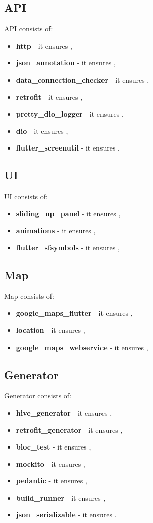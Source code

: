 \subsection{API}\label{subsec:api}
API consists of:
\begin{itemize}
    \item \textbf{http} - it ensures ,
    \item \textbf{json\_annotation} - it ensures ,
    \item \textbf{data\_connection\_checker} - it ensures ,
    \item \textbf{retrofit} - it ensures ,
    \item \textbf{pretty\_dio\_logger} - it ensures ,
    \item \textbf{dio} - it ensures ,
    \item \textbf{flutter\_screenutil} - it ensures ,
\end{itemize}

\subsection{UI}\label{subsec:ui}
UI consists of:
\begin{itemize}
    \item \textbf{sliding\_up\_panel} - it ensures ,
    \item \textbf{animations} - it ensures ,
    \item \textbf{flutter\_sfsymbols} - it ensures ,
\end{itemize}

\subsection{Map}\label{subsec:map}
Map consists of:
\begin{itemize}
    \item \textbf{google\_maps\_flutter} - it ensures ,
    \item \textbf{location} - it ensures ,
    \item \textbf{google\_maps\_webservice} - it ensures ,
\end{itemize}

\subsection{Generator}\label{subsec:generator}
Generator consists of:
\begin{itemize}
    \item \textbf{hive\_generator} - it ensures ,
    \item \textbf{retrofit\_generator} - it ensures ,
    \item \textbf{bloc\_test} - it ensures ,
    \item \textbf{mockito} - it ensures ,
    \item \textbf{pedantic} - it ensures ,
    \item \textbf{build\_runner} - it ensures ,
    \item \textbf{json\_serializable} - it ensures .
\end{itemize}

